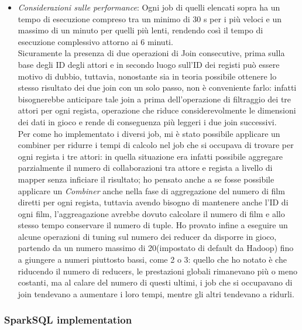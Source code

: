 \documentclass[hidelinks]{article}
\begin{document}
\begin{itemize}
\begin{itemize}
		
	\end{itemize}
	\item \textit{Considerazioni sulle performance}: Ogni job di quelli elencati sopra ha un tempo di esecuzione compreso tra un minimo di 30 s per i più veloci e un massimo di un minuto per quelli più lenti, rendendo così il tempo di esecuzione complessivo attorno ai 6 minuti.\\
	Sicuramente la presenza di due operazioni di Join consecutive, prima sulla base degli ID degli attori e in secondo luogo sull'ID dei registi può essere motivo di dubbio, tuttavia, nonostante sia in teoria possibile ottenere lo stesso risultato dei due join con un solo passo, non è conveniente farlo: infatti bisognerebbe anticipare tale join a prima dell'operazione di filtraggio dei tre attori per ogni regista, operazione che riduce considerevolmente le dimensioni dei dati in gioco e rende di conseguenza più leggeri i due join successivi.\\
	Per come ho implementato i diversi job, mi è stato possibile applicare un combiner per ridurre i tempi di calcolo nel job che si occupava di trovare per ogni regista i tre attori: in quella situazione era infatti possibile aggregare parzialmente il numero di collaborazioni tra attore e regista a livello di mapper senza inficiare il risultato; ho pensato anche a se fosse possibile applicare un \textit{Combiner} anche nella fase di aggregazione del numero di film diretti per ogni regista, tuttavia avendo bisogno di mantenere anche l'ID di ogni film, l'aggreagazione avrebbe dovuto  calcolare il numero di film e allo stesso tempo conservare il numero di tuple.
	Ho provato infine a eseguire un alcune operazioni di tuning sul numero dei reducer da disporre in gioco, partendo da un numero massimo di 20(impostato di default da Hadoop) fino a giungere a numeri piuttosto bassi, come 2 o 3: quello che ho notato è che riducendo il numero di reducers, le prestazioni globali rimanevano più o meno costanti, ma al calare del numero di questi ultimi, i job che si occupavano di join tendevano a aumentare i loro tempi, mentre gli altri tendevano a ridurli. 
\end{itemize}

\subsubsection{SparkSQL implementation}
\end{document}
